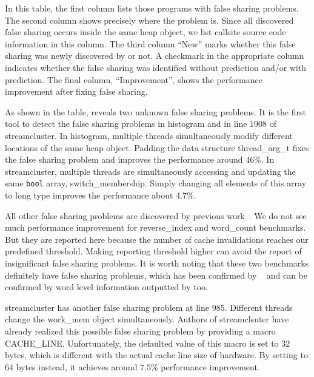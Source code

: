 In this table, the first column lists those programs with false sharing problems.  The second column shows precisely where the problem is. Since all discovered false sharing occurs inside the same heap object, we list callsite source code information in this column.  The third column ``New'' marks whether this false sharing was newly
discovered by \Predator{} or not.  A checkmark in the appropriate
column indicates whether the false sharing was identified without
prediction and/or with prediction.  The final column, ``Improvement'',
shows the performance improvement after fixing false sharing.

As shown in the table, \Predator{} reveals two unknown false sharing problems. 
It is the first tool to detect the false sharing problems in histogram and in line $1908$ of streamcluster. 
In histogram, multiple threads simultaneously modify different locations of the same heap object. 
Padding the data structure thread\_arg\_t fixes the false sharing problem and improves the performance around 46\%. In streamcluster, multiple threads are simultaneously accessing and updating the same \texttt{bool} array, switch\_membership. Simply changing all elements of this array to long type improves the performance about 4.7\%.

All other false sharing problems are discovered by previous work~\cite{sheriff}. We do not see much performance improvement for reverse\_index and word\_count benchmarks. But they are reported here because the number of cache invalidations 
reaches our predefined threshold.
Making reporting threshold higher can avoid the report of insignificant false sharing problems.
It is worth noting that these two benchmarks definitely have false sharing problems,
which has been confirmed by \Sheriff~\cite{sheriff} and can be confirmed by word level information outputted by \Predator{} too. 

streamcluster has another false sharing problem at line $985$. Different threads change the work\_mem object simultaneously. Authors of streamclsuter have already realized this possible false sharing problem by providing a macro CACHE\_LINE. Unfortunately, the defaulted value of this macro is set to $32$ bytes, which is different with the actual cache line size of hardware. By setting to $64$ bytes instead, it achieves around $7.5\%$ performance improvement.

